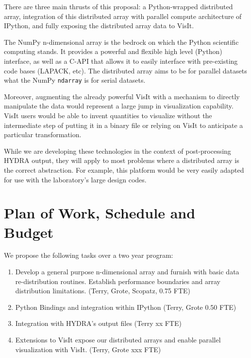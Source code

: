 \documentclass[letterpaper,12pt]{article}
\begin{document}
There are three main thrusts of this proposal: a Python-wrapped distributed array, integration 
of this distributed array with parallel compute architecture of IPython, and fully exposing 
the distributed array data to VisIt.  

The NumPy n-dimensional array is the bedrock on which the Python scientific computing stands.  
It provides a powerful and flexible high level (Python) interface, as well as a C-API that 
allows it to easily interface with pre-existing code bases (LAPACK, etc).  The distributed 
array aims to be for parallel datasets what the NumPy \texttt{ndarray} is for serial datasets.

Moreover, augmenting the already powerful VisIt with a mechanism to directly manipulate the 
data would represent a large jump in visualization capability.  VisIt users would be able 
to invent quantities to visualize without the intermediate step of putting it in a binary 
file or relying on VisIt to anticipate a particular transformation.

While we are developing these technologies in the context of post-processing HYDRA output, 
they will apply to most problems where a distributed array is the correct abstraction.  
For example, this platform would be very easily adapted for use with the laboratory's large 
design codes.



\section*{Plan of Work, Schedule and Budget}

We propose the following tasks over a two year program:

\begin{enumerate}
	\item Develop a general purpose n-dimensional array and furnish with basic data re-distribution routines.  Establish performance boundaries and array distribution limitations. (Terry, Grote, Scopatz, 0.75 FTE) 

	\item Python Bindings and integration within IPython (Terry, Grote 0.50 FTE)

	\item Integration with HYDRA's output files (Terry xx FTE)

	\item Extensions to VisIt expose our distributed arrays and enable parallel visualization with VisIt. (Terry, Grote xxx FTE)

\end{enumerate}
\end{document}
